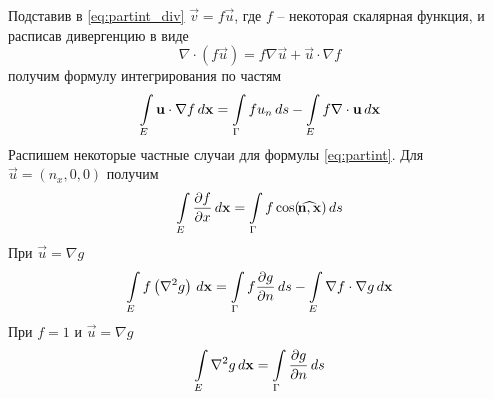 Подставив в \cref{eq:partint_div} $\vec v = f\vec u$, где $f$ -- некоторая скалярная функция, и 
расписав дивергенцию в виде
$$\nabla\cdot(f\vec u) = f\nabla\vec u + \vec u \cdot \nabla f$$
получим формулу интегрирования по частям
\begin{equation}
\label{eq:partint}
\arint{\vec u \cdot \nabla f}{E}{\vec x} = \arint{f u_n}{\Gamma}{s} - \arint{f\nabla\cdot \vec u}{E}{\vec x}
\end{equation}
Распишем некоторые частные случаи для формулы \cref{eq:partint}.
Для $\vec u = (n_x, 0, 0)$ получим
\begin{equation}
\label{eq:partint_ugrad_}
\arint{\dfr{f}{x}}{E}{\vec x} = \arint{f \cos(\vecangle{n}{x})}{\Gamma}{s}
\end{equation}
При $\vec u = \nabla g$
\begin{equation}
\label{eq:partint_laplace_fg}
\arint{f\left(\nabla^2 g \right)}{E}{\vec x} = \arint{f\dfr{g}{n}}{\Gamma}{s} - \arint{\nabla f \cdot \nabla g}{E}{\vec x}
\end{equation}
При $f=1$ и $\vec u = \nabla g$
\begin{equation}
\label{eq:partint_laplace}
\arint{\nabla^2 g}{E}{\vec x} = \arint{\dfr{g}{n}}{\Gamma}{s}
\end{equation}
